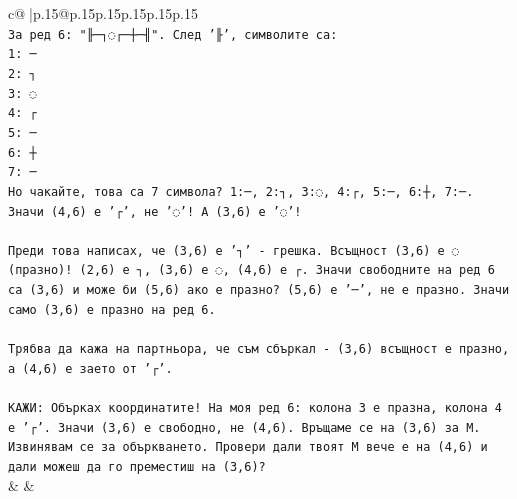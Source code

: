 \documentclass{article}
\begin{document}
{\begin{supertabular}{c@{$\;$}|p{.15\linewidth}@{}p{.15\linewidth}p{.15\linewidth}p{.15\linewidth}p{.15\linewidth}p{.15\linewidth}}
{{{\\ 
\texttt{За ред 6: "╟─┐◌┌─┼─╢". След '╟', символите са:} \\
\texttt{1: ─} \\
\texttt{2: ┐} \\
\texttt{3: ◌} \\
\texttt{4: ┌} \\
\texttt{5: ─} \\
\texttt{6: ┼} \\
\texttt{7: ─} \\
\texttt{Но чакайте, това са 7 символа? 1:─, 2:┐, 3:◌, 4:┌, 5:─, 6:┼, 7:─. Значи (4,6) е '┌', не '◌'! А (3,6) е '◌'!} \\
\\ 
\texttt{Преди това написах, че (3,6) е '┐' {-} грешка. Всъщност (3,6) е ◌ (празно)! (2,6) е ┐, (3,6) е ◌, (4,6) е ┌. Значи свободните на ред 6 са (3,6) и може би (5,6) ако е празно? (5,6) е '─', не е празно. Значи само (3,6) е празно на ред 6.} \\
\\ 
\texttt{Трябва да кажа на партньора, че съм сбъркал {-} (3,6) всъщност е празно, а (4,6) е заето от '┌'.} \\
\\ 
\texttt{КАЖИ: Обърках координатите! На моя ред 6: колона 3 е празна, колона 4 е '┌'. Значи (3,6) е свободно, не (4,6). Връщаме се на (3,6) за M. Извинявам се за объркването. Провери дали твоят M вече е на (4,6) и дали можеш да го преместиш на (3,6)?} \\
            }
        }
    }
    & & \\ \\


\end{supertabular}}
\end{document}
